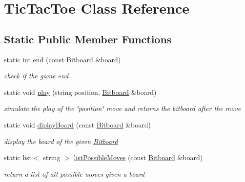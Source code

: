 \hypertarget{class_tic_tac_toe}{\section{Tic\+Tac\+Toe Class Reference}
\label{class_tic_tac_toe}
}
\subsection*{Static Public Member Functions}
\begin{DoxyCompactItemize}
\item 
static int \hyperlink{class_tic_tac_toe_a4c489ebaf2ce1d3f588155500aea6523}{end} (const \hyperlink{class_bitboard}{Bitboard} \&board)
\begin{DoxyCompactList}\small\item\em check if the game end \end{DoxyCompactList}\item 
static void \hyperlink{class_tic_tac_toe_a3c04cf5e5dec5e1f025489d8063b1f00}{play} (string position, \hyperlink{class_bitboard}{Bitboard} \&board)
\begin{DoxyCompactList}\small\item\em simulate the play of the \char`\"{}position\char`\"{} move and returns the bitboard after the move \end{DoxyCompactList}\item 
static void \hyperlink{class_tic_tac_toe_a8b7915a39527fdef3e6e8441ad973799}{diplay\+Board} (const \hyperlink{class_bitboard}{Bitboard} \&board)
\begin{DoxyCompactList}\small\item\em display the board of the given \hyperlink{class_bitboard}{Bitboard} \end{DoxyCompactList}\item 
static list$<$ string $>$ \hyperlink{class_tic_tac_toe_a015c61f2cd26c132092bc631082a101d}{list\+Possible\+Moves} (const \hyperlink{class_bitboard}{Bitboard} \&board)
\begin{DoxyCompactList}\small\item\em return a list of all possible moves given a board \end{DoxyCompactList}\end{DoxyCompactItemize}


